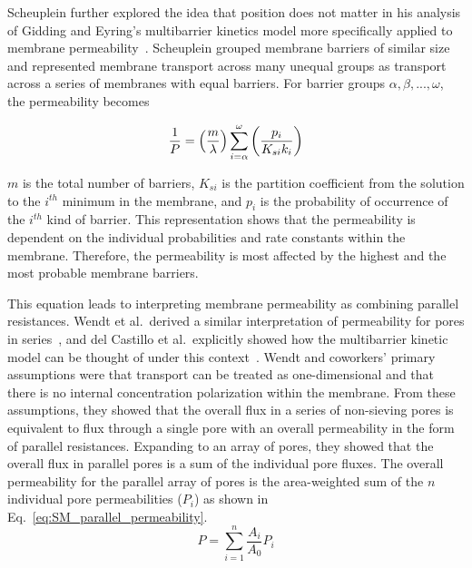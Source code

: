 Scheuplein further explored the idea that position does not matter in his analysis of Gidding and Eyring’s multibarrier kinetics model more specifically applied to membrane permeability~\cite{scheuplein_application_1968}. Scheuplein grouped membrane barriers of similar size and represented membrane transport across many unequal groups as transport across a series of membranes with equal barriers. For barrier groups $\alpha, \beta, ..., \omega$, the permeability becomes 

\begin{equation}
    \frac{1}{P} = \left( \frac{m}{\lambda} \right) \sum_{i=\alpha}^{\omega} \left( \frac{p_i}{K_{si} k_i} \right)
\end{equation}

\noindent $m$ is the total number of barriers, $K_{si}$ is the partition coefficient from the solution to the $i^{th}$ minimum in the membrane, and $p_i$ is the probability of occurrence of the $i^{th}$ kind of barrier. This representation shows that the permeability is dependent on the individual probabilities and rate constants within the membrane. Therefore, the permeability is most affected by the highest and the most probable membrane barriers. 

This equation leads to interpreting membrane permeability as combining parallel resistances. Wendt et al.~derived a similar interpretation of permeability for pores in series~\cite{wendt_effect_1976}, and del Castillo et al.~explicitly showed how the multibarrier kinetic model can be thought of under this context~\cite{del_castillo_energy-barrier_1979}. Wendt and coworkers' primary assumptions were that transport can be treated as one-dimensional and that there is no internal concentration polarization within the membrane. From these assumptions, they showed that the overall flux in a series of non-sieving pores is equivalent to flux through a single pore with an overall permeability in the form of parallel resistances. Expanding to an array of pores, they showed that the overall flux in parallel pores is a sum of the individual pore fluxes. The overall permeability for the parallel array of pores is the area-weighted sum of the $n$ individual pore permeabilities ($P_i$) as shown in Eq.~\ref{eq:SM_parallel_permeability}. 
\begin{equation}
    P = \sum_{i=1}^n \frac{A_i}{A_0} P_i
    \label{eq:SM_parallel_permeability}
\end{equation}

